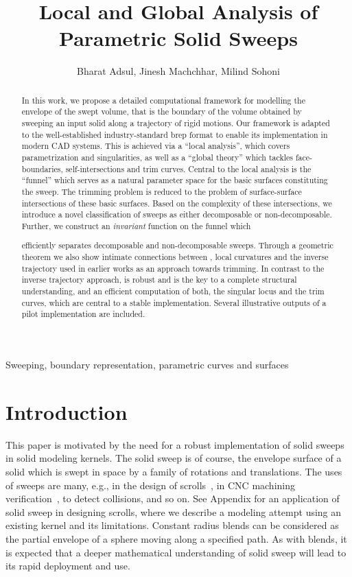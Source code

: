 \documentclass{elsart5p}
\newcommand{\eat}[1]{}
\begin{document}
\begin{frontmatter}




\title{Local and Global Analysis of Parametric Solid Sweeps}


 \author{Bharat Adsul, Jinesh Machchhar, Milind Sohoni}          
\begin{abstract}
In this work, we propose a detailed computational framework for modelling the
envelope of the swept volume, that is the boundary of the volume obtained by
sweeping an input solid along a trajectory of rigid motions. Our framework 
is adapted to the well-established
industry-standard brep format to enable its implementation in modern CAD
systems. This is achieved via a ``local analysis'', which covers
parametrization and singularities, as well as a ``global theory'' which
tackles face-boundaries, self-intersections and trim curves.  Central to
the local analysis is the ``funnel'' which serves as a natural parameter space
for the basic surfaces constituting the sweep. The trimming problem is
reduced to the problem of surface-surface intersections of these basic surfaces.
Based on the complexity of these intersections, we introduce a
novel classification of sweeps as either decomposable or non-decomposable. Further, 
we construct an {\em invariant} function  on the funnel which 
\eat{allows us to} 
efficiently separates decomposable and non-decomposable sweeps. 
Through a geometric theorem we also show intimate
connections between , local curvatures and
the inverse trajectory used in earlier works as an approach towards trimming.
In contrast to the inverse trajectory approach,  is robust
and is the key to a complete structural understanding, and 
\eat{allows} an efficient computation of both, the singular locus and 
the trim curves, which are central to a stable implementation.  
Several illustrative outputs of a pilot implementation are included.
 
\end{abstract}

\begin{keyword}
Sweeping, boundary representation, parametric curves and surfaces
\end{keyword}
\end{frontmatter}

\section{Introduction} \label{introSec}
This paper is motivated by the need for a robust implementation of solid sweeps in
solid modeling kernels. The solid sweep is of course, the envelope
surface of a solid which is swept in space by a family of rotations and translations.
The uses of sweeps are many, e.g., in the design of scrolls~\cite{scroll}, 
in CNC machining verification~\cite{completeSweep}, 
to detect collisions, and so on. 
See Appendix for an application of solid sweep in designing scrolls,   
where we describe a modeling attempt using an existing kernel and its limitations.
Constant radius blends can be considered as the partial envelope of a sphere 
moving along a specified path.  As with blends, it is expected 
that a deeper mathematical understanding of solid sweep will lead to its rapid 
deployment and use.
\end{document}
